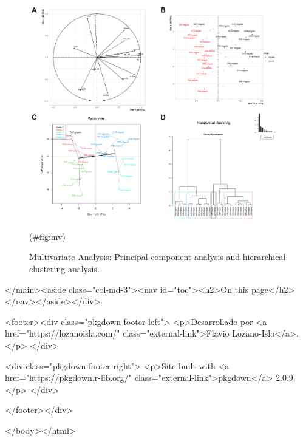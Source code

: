 \begin{Shaded}
\begin{Highlighting}[]
\OtherTok{\textless{}{-}} 
\NormalTok{                  , } 
\NormalTok{                  , } \NormalTok{)}

\NormalTok{(}
\NormalTok{        , }
\NormalTok{        , } 
\NormalTok{        , } 
\NormalTok{        , } 
\NormalTok{        , } 
\NormalTok{        , } \NormalTok{)}

\SpecialCharTok{::}\NormalTok{(}\NormalTok{)}
\end{Highlighting}
\end{Shaded}

\begin{figure}

{\centering \includegraphics[width=0.98\linewidth]{files/fig-03} 

}

\caption{Multivariate Analysis: Principal component analysis and hierarchical clustering analysis.}(\#fig:mv)
\end{figure}
  </main><aside class="col-md-3"><nav id="toc"><h2>On this page</h2>
    </nav></aside></div>



    <footer><div class="pkgdown-footer-left">
  <p>Desarrollado por <a href="https://lozanoisla.com/" class="external-link">Flavio Lozano-Isla</a>.</p>
</div>

<div class="pkgdown-footer-right">
  <p>Site built with <a href="https://pkgdown.r-lib.org/" class="external-link">pkgdown</a> 2.0.9.</p>
</div>

    </footer></div>

  

  

  </body></html>
